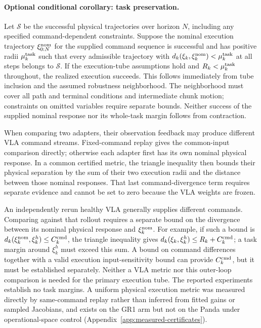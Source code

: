 \paragraph{Optional conditional corollary: task preservation.}
\label{app:task-extension}
Let $\mathcal S$ be the successful physical trajectories over horizon $N$,
including any specified command-dependent constraints. Suppose the nominal
execution trajectory $\xi_{0:N}^{\rm nom}$ for the supplied command sequence is
successful and has positive radii $\mu_k^{\rm task}$ such that every
admissible trajectory with $d_k(\xi_k,\xi_{k}^{\rm nom})<\mu_k^{\rm task}$ at
all steps belongs to $\mathcal S$. If the execution-tube assumptions hold
and $R_k<\mu_k^{\rm task}$ throughout, the realized execution succeeds.
This follows immediately from tube inclusion and the assumed robustness
neighborhood. The neighborhood must cover all path and terminal conditions
and intermediate chunk motion; constraints on omitted variables require
separate bounds. Neither success of the supplied nominal response nor
its whole-task margin follows from contraction.

When comparing two adapters, their observation feedback may produce
different VLA command streams. Fixed-command replay gives the common-input
comparison directly; otherwise each adapter first has its own nominal
physical response. In a common certified metric, the triangle inequality
then bounds their physical separation by the sum of their two execution
radii and the distance between those nominal responses. That last
command-divergence term requires separate evidence and cannot be set to
zero because the VLA weights are frozen.

An independently rerun healthy VLA generally supplies different commands.
Comparing against that rollout requires a separate bound on the divergence
between its nominal physical response and $\xi_{k}^{\rm nom}$. For example, if such
a bound is $d_k(\xi_{k}^{\rm nom},\xi_k^h)\le C_k^{\rm cmd}$, the triangle
inequality gives $d_k(\xi_k,\xi_k^h)\le R_k+C_k^{\rm cmd}$; a task
margin around $\xi_k^h$ must exceed this sum. A bound on command differences
together with a valid execution input-sensitivity bound can provide
$C_k^{\rm cmd}$, but it must be established separately. Neither a VLA
metric nor this outer-loop comparison is needed for the primary execution
tube. The reported experiments establish no task margins. A uniform physical
execution metric was measured directly by same-command replay rather than
inferred from fitted gains or sampled Jacobians, and exists on the GR1 arm
but not on the Panda under operational-space control
(Appendix~\ref{app:measured-certificates}).


